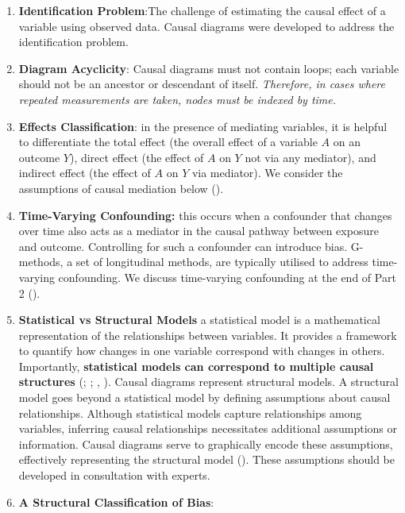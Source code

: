 \documentclass[
  singlecolumn,
  9pt]{article}
\begin{document}
\begin{enumerate}
\def\labelenumi{\arabic{enumi}.}
\setcounter{enumi}{12}
\item
  \textbf{Identification Problem}:The challenge of estimating the causal
  effect of a variable using observed data. Causal diagrams were
  developed to address the identification problem.
\item
  \textbf{Diagram Acyclicity}: Causal diagrams must not contain loops;
  each variable should not be an ancestor or descendant of itself.
  \emph{Therefore, in cases where repeated measurements are taken, nodes
  must be indexed by time.}
\item
  \textbf{Effects Classification}: in the presence of mediating
  variables, it is helpful to differentiate the total effect (the
  overall effect of a variable \(A\) on an outcome \(Y\)), direct effect
  (the effect of \(A\) on \(Y\) not via any mediator), and indirect
  effect (the effect of \(A\) on \(Y\) via mediator). We consider the
  assumptions of causal mediation below
  ().
\item
  \textbf{Time-Varying Confounding:} this occurs when a confounder that
  changes over time also acts as a mediator in the causal pathway
  between exposure and outcome. Controlling for such a confounder can
  introduce bias. G-methods, a set of longitudinal methods, are
  typically utilised to address time-varying confounding. We discuss
  time-varying confounding at the end of Part 2
  ().
\item
  \textbf{Statistical vs Structural Models} a statistical model is a
  mathematical representation of the relationships between variables. It
  provides a framework to quantify how changes in one variable
  correspond with changes in others. Importantly, \textbf{statistical
  models can correspond to multiple causal structures}
  (;
  ;
  ,
  ). Causal diagrams represent structural
  models. A structural model goes beyond a statistical model by defining
  assumptions about causal relationships. Although statistical models
  capture relationships among variables, inferring causal relationships
  necessitates additional assumptions or information. Causal diagrams
  serve to graphically encode these assumptions, effectively
  representing the structural model (). These assumptions should be developed in
  consultation with experts.
\item
  \textbf{A Structural Classification of Bias}:
\end{enumerate}
\end{document}
